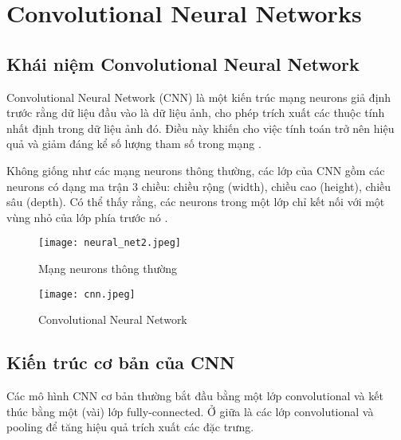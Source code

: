 \documentclass[../thesis.tex]{subfiles}
\begin{document}
\section{Convolutional Neural Networks}

\subsection{Khái niệm Convolutional Neural Network}

Convolutional Neural Network (CNN) là một kiến trúc mạng neurons giả định trước rằng dữ liệu đầu vào là dữ liệu ảnh, cho phép trích xuất các thuộc tính nhất định trong dữ liệu ảnh đó. Điều này khiến cho việc tính toán trở nên hiệu quả và giảm đáng kể số lượng tham số trong mạng \cite{cs231n}.

Không giống như các mạng neurons thông thường, các lớp của CNN gồm các neurons có dạng ma trận 3 chiều: chiều rộng (width), chiều cao (height), chiều sâu (depth). Có thể thấy rằng, các neurons trong một lớp chỉ kết nối với một vùng nhỏ của lớp phía trước nó \cite{cs231n}.
\begin{figure}[H]
	\begin{minipage}{0.48\textwidth}
		\centering
		\texttt{[image: neural\_net2.jpeg]}
		\caption{Mạng neurons thông thường}\label{Fig:NN}
	\end{minipage}\hfill
	\begin {minipage}{0.48\textwidth}
		\centering
		\texttt{[image: cnn.jpeg]}
		\caption{Convolutional Neural Network}\label{Fig:CNN}
	\end{minipage}
\end{figure}

\subsection{Kiến trúc cơ bản của CNN}

Các mô hình CNN cơ bản thường bắt đầu bằng một lớp convolutional và kết thúc bằng một (vài) lớp fully-connected. Ở giữa là các lớp convolutional và pooling để tăng hiệu quả trích xuất các đặc trưng.
\end{document}
